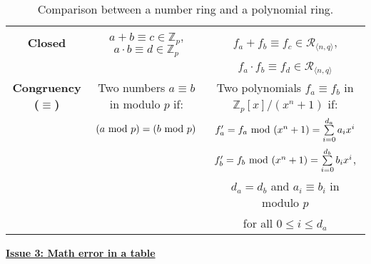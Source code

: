 \begin{table}[h]
{\begin{tabular}{|c||c|c|}
\textbf{{Closed}}& $a + b \equiv c \in \mathbb{Z}_p$, $a \cdot b \equiv d \in \mathbb{Z}_p$ & $f_a + f_b \equiv f_c \in \mathcal{R}_{\langle n, q \rangle}$, \\
&&$f_a \cdot f_b \equiv f_d \in \mathcal{R}_{\langle n, q \rangle}$\\
\hline
\textbf{{Congruency ($\equiv$)}} & Two numbers $a \equiv b$ in modulo $p$ if: & Two polynomials $f_a \equiv f_b$ in $\mathbb{Z}_p[x] / (x^n + 1)$ if:    \\
 & $(a \text{ } \text{\text{mod}} \text{ } p) = (b \text{ } \text{\text{mod}} \text{ } p)$   & $f'_a = f_a \text{ } \text{\text{mod}} \text{ } (x^n + 1) = \sum\limits_{i=0}^{d_a} a_ix^i$ \\
 & & $f'_b = f_b \text{ } \text{\text{mod}} \text{ } (x^n + 1) = \sum\limits_{i=0}^{d_b} b_ix^i$, \\
&& $d_a = d_b$ and $a_i \equiv b_i$ in modulo $p$\\
&&for all $0 \leq i \leq d_a$\\ 
\hline
\end{tabular}}
\centering
\caption{Comparison between a number ring and a polynomial ring.
}
\label{tab:ring-comparison}
\end{table}


\underline{\textbf{Issue 3: Math error in a table}}


